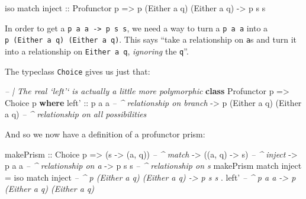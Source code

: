 \documentclass[]{article}
\newenvironment{Shaded}{}{}
\newcommand{\CommentTok}[1]{\textcolor[rgb]{0.38,0.63,0.69}{\textit{#1}}}
\newcommand{\DataTypeTok}[1]{\textcolor[rgb]{0.56,0.13,0.00}{#1}}
\newcommand{\FunctionTok}[1]{\textcolor[rgb]{0.02,0.16,0.49}{#1}}
\newcommand{\KeywordTok}[1]{\textcolor[rgb]{0.00,0.44,0.13}{\textbf{#1}}}
\newcommand{\NormalTok}[1]{#1}
\newcommand{\OtherTok}[1]{\textcolor[rgb]{0.00,0.44,0.13}{#1}}
\begin{document}
\begin{Shaded}
\begin{Highlighting}[]
\NormalTok{iso match inject}
\OtherTok{    ::} \DataTypeTok{Profunctor}\NormalTok{ p}
    \OtherTok{=>}\NormalTok{ p (}\DataTypeTok{Either}\NormalTok{ a q) (}\DataTypeTok{Either}\NormalTok{ a q)}
    \OtherTok{->}\NormalTok{ p s s}
\end{Highlighting}
\end{Shaded}

In order to get a \texttt{p\ a\ a\ -\textgreater{}\ p\ s\ s}, we need a way to
turn a \texttt{p\ a\ a} into a \texttt{p\ (Either\ a\ q)\ (Either\ a\ q)}. This
says ``take a relationship on \texttt{a}s and turn it into a relationship on
\texttt{Either\ a\ q}, \emph{ignoring} the \texttt{q}''.

The typeclass \texttt{Choice} gives us just that:

\begin{Shaded}
\begin{Highlighting}[]
\CommentTok{-- | The real `left'` is actually a little more polymorphic}
\KeywordTok{class} \DataTypeTok{Profunctor}\NormalTok{ p }\OtherTok{=>} \DataTypeTok{Choice}\NormalTok{ p }\KeywordTok{where}
\NormalTok{    left'}
\OtherTok{        ::}\NormalTok{ p a a                        }\CommentTok{-- ^ relationship on branch}
        \OtherTok{->}\NormalTok{ p (}\DataTypeTok{Either}\NormalTok{ a q) (}\DataTypeTok{Either}\NormalTok{ a q)  }\CommentTok{-- ^ relationship on all possibilities}
\end{Highlighting}
\end{Shaded}

And so we now have a definition of a profunctor prism:

\begin{Shaded}
\begin{Highlighting}[]
\NormalTok{makePrism}
\OtherTok{    ::} \DataTypeTok{Choice}\NormalTok{ p}
    \OtherTok{=>}\NormalTok{ (s }\OtherTok{->}\NormalTok{ (a, q))        }\CommentTok{-- ^ match}
    \OtherTok{->}\NormalTok{ ((a, q) }\OtherTok{->}\NormalTok{ s)        }\CommentTok{-- ^ inject}
    \OtherTok{->}\NormalTok{ p a a                }\CommentTok{-- ^ relationship on a}
    \OtherTok{->}\NormalTok{ p s s                }\CommentTok{-- ^ relationship on s}
\NormalTok{makePrism match inject }\FunctionTok{=}
\NormalTok{    iso match inject   }\CommentTok{-- ^ p (Either a q) (Either a q) -> p s s}
  \FunctionTok{.}\NormalTok{ left'              }\CommentTok{-- ^ p a a -> p (Either a q) (Either a q)}
\end{Highlighting}
\end{Shaded}
\end{document}
